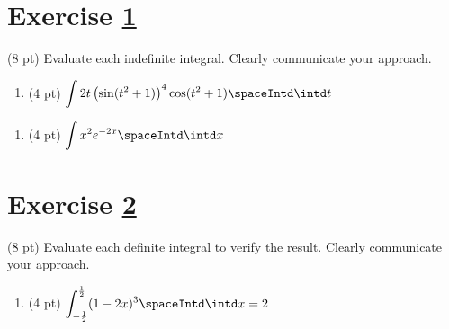 




%
%
%
%


\newpage

\section{Exercise \ref{sec : Math112 Spring2022 FinalExam P3Q2}}
\label{sec : Math112 Spring2022 FinalExam P3Q2}

(8 pt) Evaluate each indefinite integral. Clearly communicate your approach.

\begin{enumerate}[label=(\alph*)]
\item\label{itm : Exam4P3Q2a} (4 pt) $\displaystyle\int 2 t \left(\sin(t^{2} + 1)\right)^{4} \cos(t^{2} + 1) \spaceIntd \intd t$
\end{enumerate}

\spaceSolution{3in}{%
}%



\begin{enumerate}[resume,label=(\alph*)]
\item\label{itm : Exam4P3Q2b} (4 pt) $\displaystyle\int x^{2} e^{-2 x} \spaceIntd \intd x$
\end{enumerate}

\spaceSolution{3in}{%
}%





%
%
%
%


\newpage

\section{Exercise \ref{sec : Math112 Spring2022 FinalExam P3Q3}}
\label{sec : Math112 Spring2022 FinalExam P3Q3}

(8 pt) Evaluate each definite integral to verify the result. Clearly communicate your approach.

\begin{enumerate}[label=(\alph*)]
\item\label{itm : Exam4P3Q3a} (4 pt) $\displaystyle\int_{-\frac{1}{2}}^{\frac{1}{2}} (1 - 2 x)^{3} \spaceIntd \intd x = 2$
\end{enumerate}

